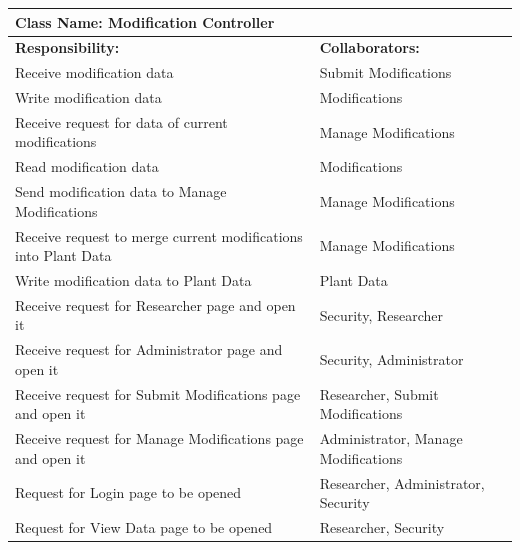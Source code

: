 \documentclass[]{article}
\begin{document}
		\centering
		\begin{tabular}{|p{7cm}|p{7cm}|}
		\hline 
		 \multicolumn{2}{|l|}{\textbf{Class Name: Modification Controller}} \\
		\hline
		\textbf{Responsibility:} & \textbf{Collaborators:} \\
		\hline
		Receive modification data & Submit Modifications \\
		\hline
		Write modification data & Modifications \\
		\hline
		Receive request for data of current modifications & Manage Modifications \\
		\hline
		Read modification data & Modifications \\
		\hline
		Send modification data to Manage Modifications & Manage Modifications \\
		\hline
		Receive request to merge current modifications into Plant Data & Manage Modifications \\
		\hline 
		Write modification data to Plant Data & Plant Data \\
		\hline
		Receive request for Researcher page and open it & Security, Researcher \\
		\hline
		Receive request for Administrator page and open it & Security, Administrator\\
		\hline
		Receive request for Submit Modifications page and open it &  Researcher, Submit Modifications \\
		\hline
		Receive request for Manage Modifications page and open it & Administrator, Manage Modifications \\
		\hline
		Request for Login page to be opened & Researcher, Administrator, Security \\
		\hline
		Request for View Data page to be opened & Researcher, Security \\
		\hline
		\end{tabular}
	\newline
	\vspace*{0.5 cm}
	\newline
\end{document}
